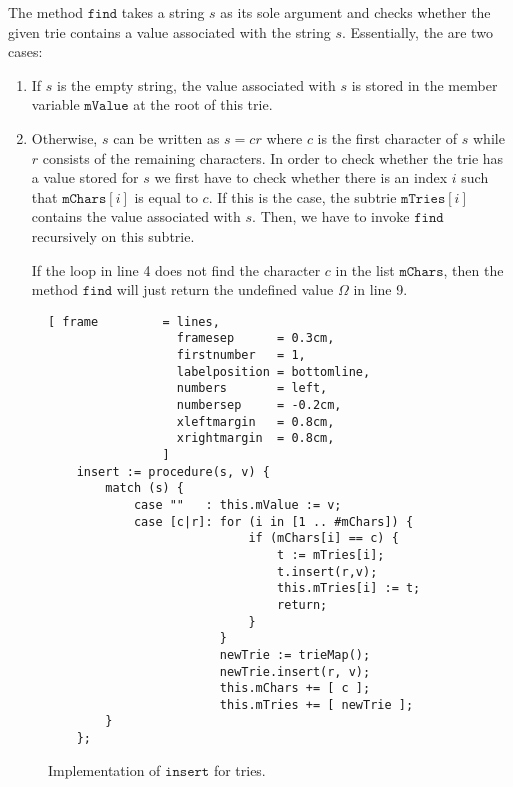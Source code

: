 The method $\mathtt{find}$ takes a string $s$ as its sole argument and checks whether the given trie
contains a value associated with the string $s$.  Essentially, the are two cases:
\begin{enumerate}
\item If $s$ is the empty string, the value associated with $s$ is stored in the member variable
      $\mathtt{mValue}$ at the root of this trie.
\item Otherwise, $s$ can be written as $s = cr$ where $c$ is the first character of $s$ while $r$
      consists of the remaining characters.  In order to check whether the trie has a value stored
      for $s$ we first have to check whether there is an index $i$ such that $\mathtt{mChars}[i]$ is
      equal to $c$.  If this is the case, the subtrie $\mathtt{mTries}[i]$ contains the value
      associated with $s$.  Then, we have to invoke $\mathtt{find}$ recursively on this subtrie.

      If the loop in line 4 does not find the character $c$ in the list $\mathtt{mChars}$, then the method
      $\mathtt{find}$ will just return the undefined value $\Omega$ in line 9.
\end{enumerate}


\begin{figure}[!ht]
\centering
\begin{Verbatim}[ frame         = lines, 
                  framesep      = 0.3cm, 
                  firstnumber   = 1,
                  labelposition = bottomline,
                  numbers       = left,
                  numbersep     = -0.2cm,
                  xleftmargin   = 0.8cm,
                  xrightmargin  = 0.8cm,
                ]
    insert := procedure(s, v) {
        match (s) {
            case ""   : this.mValue := v;
            case [c|r]: for (i in [1 .. #mChars]) {
                            if (mChars[i] == c) {
                                t := mTries[i];
                                t.insert(r,v);
                                this.mTries[i] := t;
                                return;
                            }
                        }
                        newTrie := trieMap();
                        newTrie.insert(r, v);
                        this.mChars += [ c ]; 
                        this.mTries += [ newTrie ];
        } 
    };
\end{Verbatim}
\vspace*{-0.3cm}
\caption{Implementation of $\mathtt{insert}$ for tries.}
\label{fig:trie.stlx-insert}
\end{figure}


